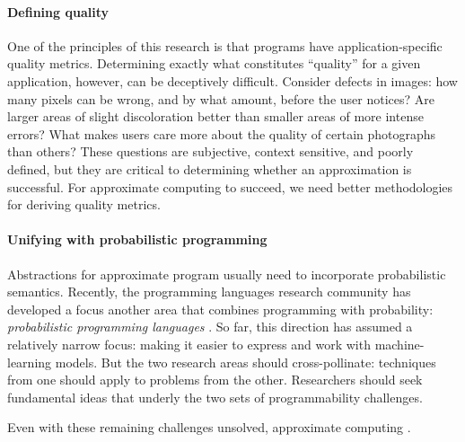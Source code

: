 \paragraph{Defining quality}
One of the principles of this research is that programs have
application-specific quality metrics.
Determining exactly what constitutes ``quality'' for a given application,
however, can be deceptively difficult.
Consider defects in images:
how many pixels can be wrong, and by what amount, before the user notices?
Are larger areas of slight discoloration better than smaller areas of more
intense errors?
What makes users care more about the quality of certain photographs than
others?
These questions are subjective, context sensitive, and poorly defined, but
they are critical to determining whether an approximation is successful.
For approximate computing to succeed, we need better methodologies for
deriving quality metrics.

\paragraph{Unifying with probabilistic programming}
Abstractions for approximate program usually need to incorporate probabilistic
semantics.
Recently, the programming languages research community has developed a focus
another area that combines programming with probability:
\emph{probabilistic programming languages} .
So far, this direction has assumed a relatively narrow focus:
making it easier to express and work with machine-learning models.
But the two research areas should cross-pollinate:
techniques from one should apply to problems from the other.
Researchers should seek fundamental ideas that underly the two sets of
programmability challenges.

\vspace{\baselineskip}
\noindent
Even with these remaining challenges unsolved, approximate computing .
